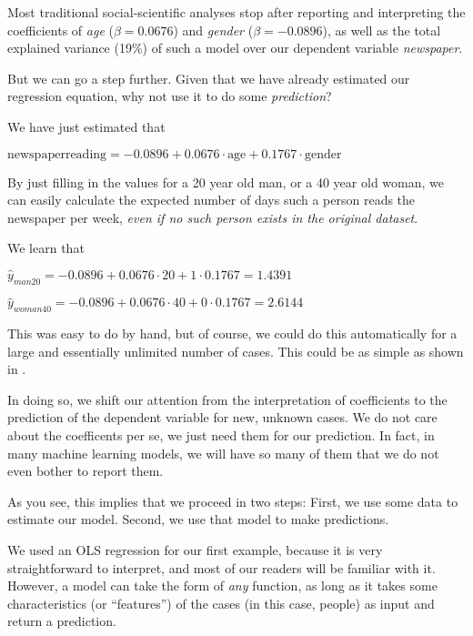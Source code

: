 
Most traditional social-scientific analyses stop after reporting and
interpreting the coefficients of \emph{age} ($\beta = 0.0676$) and \emph{gender} ($\beta = -0.0896$), as well as the total explained variance (19\%) of such a model over our dependent variable \emph{newspaper}.

But we can go a step further. Given that we have already estimated our
regression equation, why not use it to do some \textit{prediction}?

We have just estimated that

$\textrm{newspaperreading} = -0.0896 + 0.0676 \cdot \textrm{age} + 0.1767 \cdot \textrm{gender}$

By just filling in the values for a 20 year old man, or a 40 year old
woman, we can easily calculate the expected number of days such a
person reads the newspaper per week, \emph{even if no such person
  exists in the original dataset}.

We learn that

$\hat{y}_{man20} = -0.0896 + 0.0676 \cdot 20 + 1 \cdot 0.1767 = 1.4391$

$\hat{y}_{woman40} = -0.0896 + 0.0676 \cdot 40 + 0 \cdot 0.1767 = 2.6144$

This was easy to do by hand, but of course, we could do this automatically for a large and essentially unlimited number of cases.
This could be as simple as shown in .


In doing so, we shift our attention from the interpretation of coefficients to the prediction of the dependent variable for new, unknown cases. We do not
care about the coefficents per se, we just need them for our prediction.
In fact, in many machine learning models, we will have so many of them that
we do not even bother to report them.

As you see, this implies that we proceed in two steps: First, we use some data
to estimate our model. Second, we use that model to make predictions.

We used an OLS regression for our first example, because it is very
straightforward to interpret, and most of our readers will be familiar
with it.  However, a model can take the form of \emph{any} function,
as long as it takes some characteristics (or ``features'') of the
cases (in this case, people) as input and return a prediction.

